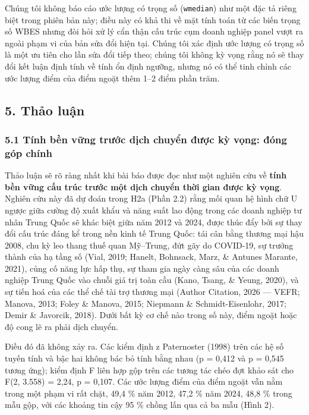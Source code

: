 \documentclass[12pt,a4paper]{article}
\begin{document}
Chúng tôi không báo cáo ước lượng có trọng số (\texttt{wmedian}) như một
đặc tả riêng biệt trong phiên bản này; điều này có khả thi về mặt tính
toán từ các biến trọng số WBES nhưng đòi hỏi xử lý cẩn thận cấu trúc cụm
doanh nghiệp panel vượt ra ngoài phạm vi của bản sửa đổi hiện tại. Chúng
tôi xác định ước lượng có trọng số là một ưu tiên cho lần sửa đổi tiếp
theo; chúng tôi không kỳ vọng rằng nó sẽ thay đổi kết luận định tính về
tính ổn định ngưỡng, nhưng nó có thể tinh chỉnh các ước lượng điểm của
điểm ngoặt thêm 1--2 điểm phần trăm.

\hypertarget{5-thux1ea3o-luux1eadn}{%
\subsection{5. Thảo luận}\label{5-thux1ea3o-luux1eadn}}

\hypertarget{51-tuxednh-bux1ec1n-vux1eefng-trux1b0ux1edbc-dux1ecbch-chuyux1ec3n-ux111ux1b0ux1ee3c-kux1ef3-vux1ecdng-ux111uxf3ng-guxf3p-chuxednh}{%
\subsubsection{5.1 Tính bền vững trước dịch chuyển được kỳ vọng: đóng
góp
chính}\label{51-tuxednh-bux1ec1n-vux1eefng-trux1b0ux1edbc-dux1ecbch-chuyux1ec3n-ux111ux1b0ux1ee3c-kux1ef3-vux1ecdng-ux111uxf3ng-guxf3p-chuxednh}}

Thảo luận sẽ rõ ràng nhất khi bài báo được đọc như một nghiên cứu về
\textbf{tính bền vững cấu trúc trước một dịch chuyển thời gian được kỳ
vọng}. Nghiên cứu này đã dự đoán trong H2a (Phần 2.2) rằng mối quan hệ
hình chữ U ngược giữa cường độ xuất khẩu và năng suất lao động trong các
doanh nghiệp tư nhân Trung Quốc sẽ khác biệt giữa năm 2012 và 2024, được
thúc đẩy bởi sự thay đổi cấu trúc đáng kể trong nền kinh tế Trung Quốc:
tái cân bằng thương mại hậu 2008, chu kỳ leo thang thuế quan Mỹ--Trung,
đứt gãy do COVID-19, sự trưởng thành của hạ tầng số (Vial, 2019; Hanelt,
Bohnsack, Marz, \& Antunes Marante, 2021), củng cố năng lực hấp thụ, sự
tham gia ngày càng sâu của các doanh nghiệp Trung Quốc vào chuỗi giá trị
toàn cầu (Kano, Tsang, \& Yeung, 2020), và sự tiến hoá của các thể chế
tài trợ thương mại (Author Citation, 2026 --- VEFR; Manova, 2013; Foley
\& Manova, 2015; Niepmann \& Schmidt-Eisenlohr, 2017; Demir \& Javorcik,
2018). Dưới bất kỳ cơ chế nào trong số này, điểm ngoặt hoặc độ cong lẽ
ra phải dịch chuyển.

Điều đó đã không xảy ra. Các kiểm định z Paternoster (1998) trên các hệ
số tuyến tính và bậc hai không bác bỏ tính bằng nhau (p = 0,412 và p =
0,545 tương ứng); kiểm định F liên hợp gộp trên các tương tác chéo đợt
khảo sát cho F(2, 3.558) = 2,24, p = 0,107. Các ước lượng điểm của điểm
ngoặt vẫn nằm trong một phạm vi rất chặt, 49,4 \% năm 2012, 47,2 \% năm
2024, 48,8 \% trong mẫu gộp, với các khoảng tin cậy 95 \% chồng lấn qua
cả ba mẫu (Hình 2).
\end{document}
